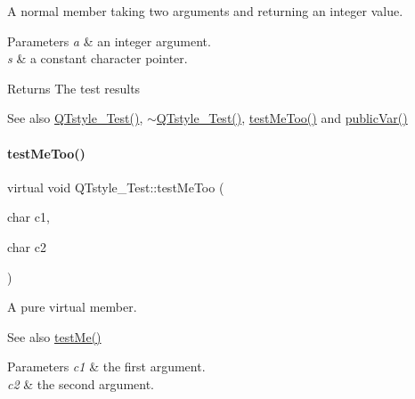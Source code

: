 A normal member taking two arguments and returning an integer value. 


\begin{DoxyParams}{Parameters}
{\em a} & an integer argument. \\
\hline
{\em s} & a constant character pointer. \\
\hline
\end{DoxyParams}
\begin{DoxyReturn}{Returns}
The test results 
\end{DoxyReturn}
\begin{DoxySeeAlso}{See also}
\hyperlink{class_q_tstyle___test_a14a296ea4e2ad446712f2310bec60766}{Q\+Tstyle\+\_\+\+Test()}, \hyperlink{class_q_tstyle___test_a7e82397d534d9a867f0857da01a46e9e}{$\sim$\+Q\+Tstyle\+\_\+\+Test()}, \hyperlink{class_q_tstyle___test_ad5b201f097a720d44bf976c2f27efbda}{test\+Me\+Too()} and \hyperlink{class_q_tstyle___test_aabf7b2e9ed83ea44aca4d213baae06d3}{public\+Var()} 
\end{DoxySeeAlso}
\hypertarget{class_q_tstyle___test_ad5b201f097a720d44bf976c2f27efbda}{}\label{class_q_tstyle___test_ad5b201f097a720d44bf976c2f27efbda} 
\paragraph{\texorpdfstring{test\+Me\+Too()}{testMeToo()}}
{\footnotesize\ttfamily virtual void Q\+Tstyle\+\_\+\+Test\+::test\+Me\+Too (\begin{DoxyParamCaption}\item[{char}]{c1,  }\item[{char}]{c2 }\end{DoxyParamCaption})\hspace{0.3cm}{\ttfamily [pure virtual]}}



A pure virtual member. 

\begin{DoxySeeAlso}{See also}
\hyperlink{class_q_tstyle___test_a8840748753118dd468e8368a28e49c62}{test\+Me()} 
\end{DoxySeeAlso}

\begin{DoxyParams}{Parameters}
{\em c1} & the first argument. \\
\hline
{\em c2} & the second argument. \\
\hline
\end{DoxyParams}


